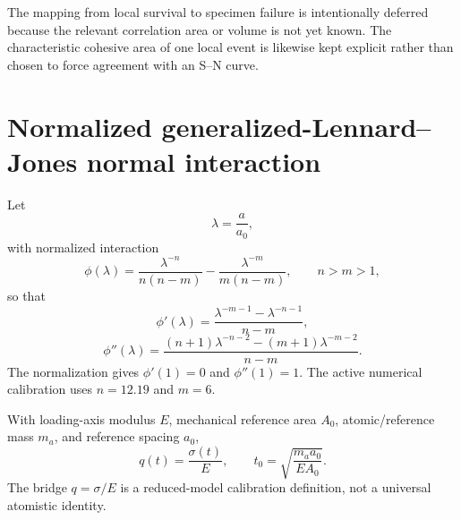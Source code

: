 \documentclass[11pt]{article}
\begin{document}
The mapping from local survival to specimen failure is intentionally deferred because the relevant correlation area or volume is not yet known. The characteristic cohesive area of one local event is likewise kept explicit rather than chosen to force agreement with an S--N curve.

\section{Normalized generalized-Lennard--Jones normal interaction}
Let
\begin{equation}
\lambda=\frac{a}{a_0},
\end{equation}
with normalized interaction
\begin{equation}
\phi(\lambda)
=\frac{\lambda^{-n}}{n(n-m)}
-\frac{\lambda^{-m}}{m(n-m)},
\qquad n>m>1,
\label{eq:phi}
\end{equation}
so that
\begin{equation}
\phi'(\lambda)=\frac{\lambda^{-m-1}-\lambda^{-n-1}}{n-m},
\end{equation}
\begin{equation}
\phi''(\lambda)
=\frac{(n+1)\lambda^{-n-2}-(m+1)\lambda^{-m-2}}{n-m}.
\label{eq:phipp}
\end{equation}
The normalization gives $\phi'(1)=0$ and $\phi''(1)=1$. The active numerical calibration uses $n=12.19$ and $m=6$.

With loading-axis modulus $E$, mechanical reference area $A_0$, atomic/reference mass $m_a$, and reference spacing $a_0$,
\begin{equation}
q(t)=\frac{\sigma(t)}{E},
\qquad
t_0=\sqrt{\frac{m_a a_0}{EA_0}}.
\label{eq:scales}
\end{equation}
The bridge $q=\sigma/E$ is a reduced-model calibration definition, not a universal atomistic identity.
\end{document}
